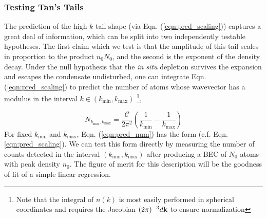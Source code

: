 \begin{figure}
\begin{center}
		\label{fig:exp_results}
	\end{center}
	\end{figure}

\subsubsection{Testing Tan's Tails}
\label{sec:good_test}

	The prediction of the high-$k$ tail shape (via Eqn. (\ref{eqn:pred_scaling})) captures a great deal of information, which can be split into two independently testable hypotheses. 
	The first claim which we test is that the amplitude of this tail scales in proportion to the product $n_0 N_0$, and the second is the exponent of the density decay.
	Under the null hypothesis that the \emph{in situ} depletion survives the expansion and escapes the condensate undisturbed, one can integrate Eqn. (\ref{eqn:pred_scaling}) to predict the number of atoms whose wavevector has a modulus in the interval $k\in (k_\textrm{min}, k_\textrm{max})$ \footnote{Note that the integral of $n(k)$ is most easily performed in spherical coordinates and requires the Jacobian $(2\pi)^{-3}d \textbf{k}$ to ensure normalization},

	\begin{equation}
		N_{k_\textrm{min},k_\textrm{max}} =\frac{\mathcal{C}}{2\pi^2}\left(\frac{1}{k_\textrm{min}}-\frac{1}{k_\textrm{max}}\right)
		\label{eqn:pred_num}
	\end{equation}
	For fixed $k_\textrm{min}$ and $k_\textrm{max}$, Eqn. (\ref{eqn:pred_num}) has the form %
(c.f. Eqn. \ref{eqn:pred_scaling}). 
	We can test this form directly by measuring the number of counts detected in the interval $(k_\textrm{min},k_\textrm{max})$ after producing a BEC of $N_0$ atoms with peak density $n_0$. 
	The figure of merit for this description will be the goodness of fit of a simple linear regression.
	
